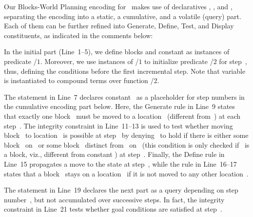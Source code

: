 Our Blocks-World Planning encoding for \iclingo\ makes use of declaratives
, , and ,
separating the encoding into a static, a cumulative, and a volatile (query) part.
Each of them can be further refined into Generate, Define, Test, and Display constituents, 
as indicated in the comments below:
%

%
In the initial  part (Line~1--5),
we define blocks and constant 
as instances of predicate /$1$.
Moreover, we use instances of /$1$
to initialize predicate /$2$ for step~, thus,
defining the conditions before the first incremental step.
Note that variable~ is instantiated to compound terms
over function /$2$.

The  statement in Line~7 declares constant~
as a placeholder for step numbers in the cumulative encoding part below.
Here, the Generate rule in Line~9 states that exactly one block~
must be moved to a location~ (different from~) at each step~.
The integrity constraint in Line~11--13 is used to test whether
moving block~ to location~ is possible at step~
by denying~ to hold if there
is either some block~ on~ or some block~ distinct from~ on~
(this condition is only checked if~ is a block, viz., different from constant )
at step~.
Finally, the Define rule in Line~15 propagates
a move to the state at step~,
while the rule in Line~16--17 states that a block~ stays on a location~
if it is not moved to any other location~.

The  statement in Line~19 declares the next part as a
query depending on step number~, but not accumulated over
successive steps.
In fact, the integrity constraint in Line~21 tests whether goal conditions are
satisfied at step~.

